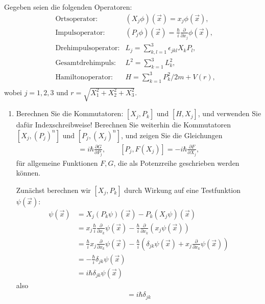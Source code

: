 \documentclass[11pt,a4paper]{scrartcl}
\begin{document}
Gegeben seien die folgenden Operatoren:
\begin{align*}
    &\text{Ortsoperator:}&(X_j\phi)(\vec{x}) = x_j\phi(\vec{x}),\\ 
    &\text{Impulsoperator:}&(P_j\phi)(\vec{x}) = \frac{\hbar}{i}\frac{\partial}{\partial x_j}\phi(\vec{x}),\\ 
    &\text{Drehimpulsoperator:}&L_j = \sum\limits_{k,l=1}^3 \epsilon_{jkl} X_k P_l,\\ 
    &\text{Gesamtdrehimpuls:}&L^2 = \sum\limits_{k=1}^3 L_k^2,\\ 
    &\text{Hamiltonoperator:}&H = \sum\limits_{k=1}^3 P_k^2/2m + V(r),\\ 
\end{align*}
wobei $j = 1,2,3$ und $r = \sqrt{X_1^2 + X_2^2 + X_3^2}$.

\begin{enumerate}[label=(\alph*)]
    \item Berechnen Sie die Kommutatoren: $[X_j, P_k]$ und $[H, X_j]$, und verwenden Sie dafür Indexschreibweise! Berechnen Sie weiterhin die Kommutatoren $[X_j, (P_j)^n]$ und $[P_j, (X_j)^n]$, und zeigen Sie die Gleichungen
    \begin{align*}
        [X_j, G(P_j)] = i\hbar \frac{\partial G}{\partial P_j},
        \qquad
        [P_j, F(X_j)] = -i\hbar \frac{\partial F}{\partial X_j},
    \end{align*}
    für allgemeine Funktionen $F,G$, die als Potenzreihe geschrieben werden können.
    \begin{tcolorbox}[title=Berechnung, breakable]
        Zunächst berechnen wir $[X_j,P_k]$ durch Wirkung auf eine Testfunktion $\psi(\vec{x})$:
        \begin{align*}
            [X_j,P_k]\psi(\vec{x}) &= X_j(P_k\psi)(\vec{x}) - P_k(X_j\psi)(\vec{x})\\
            &= x_j \frac{\hbar}{i}\frac{\partial}{\partial x_k}\psi(\vec{x}) - \frac{\hbar}{i}\frac{\partial}{\partial x_k}\left(x_j\psi(\vec{x})\right)\\
            &= \frac{\hbar}{i}x_j\frac{\partial}{\partial x_k}\psi(\vec{x}) - \frac{\hbar}{i}\left(\delta_{jk}\psi(\vec{x}) + x_j\frac{\partial}{\partial x_k}\psi(\vec{x})\right)\\
            &= -\frac{\hbar}{i}\delta_{jk}\psi(\vec{x})\\
            &= i\hbar \delta_{jk}\psi(\vec{x})
        \end{align*}
        also
        \begin{align*}
            [X_j,P_k] = i\hbar \delta_{jk}
        \end{align*}


\end{tcolorbox}
\end{enumerate}
\end{document}
